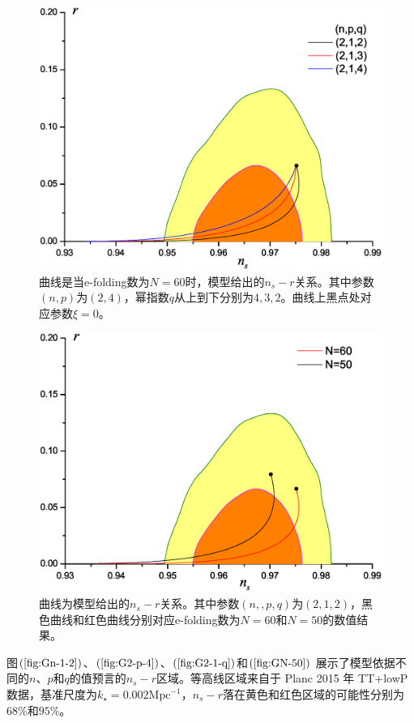 \begin{figure}\small
  \centering
  \includegraphics[width=5in]{Img/G2,1,q.eps}
  \caption{曲线是当e-folding数为$N=60$时，模型给出的$n_{s}-r$关系。其中参数$(n,
p)$为$(2,4)$，幂指数$q$从上到下分别为$4,3,2$。曲线上黑点处对应参数$\xi=0$。}\label{fig:G2-1-q}
\end{figure}

\begin{figure}\small
  \centering
  \includegraphics[width=5in]{Img/GN=50.eps}
  \caption{曲线为模型给出的$n_{s}-r$关系。其中参数$(n,
,p,q)$为$(2,1,2)$，黑色曲线和红色曲线分别对应e-folding数为$N=60$和$N=50$的数值结果。}\label{fig:GN-50}
\end{figure}

图$(\ref{fig:Gn-1-2})$、$(\ref{fig:G2-p-4})$、$(\ref{fig:G2-1-q})$和$(\ref{fig:GN-50})$
展示了模型依据不同的$n$、$p$和$q$的值预言的$n_{s}-r$区域。等高线区域来自于
Planc 2015 年 TT+lowP
数据，基准尺度为$k_{\star}=0.002\text{Mpc}^{-1}$，$n_{s}-r$落在黄色和红色区域的可能性分别为$68\%$和$95\%$。


